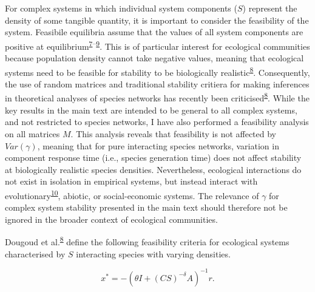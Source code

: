 \documentclass[]{article}
\begin{document}
For complex systems in which individual system components (\(S\))
represent the density of some tangible quantity, it is important to
consider the feasibility of the system. Feasibile equilibria assume that
the values of all system components are positive at
equilibrium\textsuperscript{\protect\hyperlink{ref-Grilli2017}{7}--\protect\hyperlink{ref-Song2018}{9}}.
This is of particular interest for ecological communities because
population density cannot take negative values, meaning that ecological
systems need to be feasible for stability to be biologically
realistic\textsuperscript{\protect\hyperlink{ref-Dougoud2018}{8}}.
Consequently, the use of random matrices and traditional stability
critiera for making inferences in theoretical analyses of species
networks has recently been
criticised\textsuperscript{\protect\hyperlink{ref-Dougoud2018}{8}}.
While the key results in the main text are intended to be general to all
complex systems, and not restricted to species networks, I have also
performed a feasibility analysis on all matrices \(M\). This analysis
reveals that feasibility is not affected by \(Var(\gamma)\), meaning
that for pure interacting species networks, variation in component
response time (i.e., species generation time) does not affect stability
at biologically realistic species densities. Nevertheless, ecological
interactions do not exist in isolation in empirical systems, but instead
interact with
evolutionary\textsuperscript{\protect\hyperlink{ref-Patel2018}{10}},
abiotic, or social-economic systems. The relevance of \(\gamma\) for
complex system stability presented in the main text should therefore not
be ignored in the broader context of ecological communities.

Dougoud et al.\textsuperscript{\protect\hyperlink{ref-Dougoud2018}{8}}
define the following feasibility criteria for ecological systems
characterised by \(S\) interacting species with varying densities.

\[x^{*} = -\left(\theta I + (CS)^{-\delta}A\right)^{-1}r.\]
\end{document}

